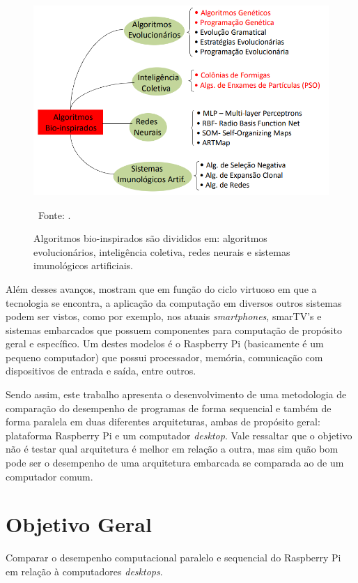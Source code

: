 \begin{figure}[htb]  
	\centering
	\includegraphics[width=.8\textwidth]{figuras/int_002}
	\caption[Algoritmos bio-inspirados]{Algoritmos bio-inspirados são divididos em: algoritmos evolucionários, inteligência coletiva, redes neurais e sistemas imunológicos artificiais.}
	\ Fonte: \cite{pappa:2015:conceitos}. 
	\label{figura:int_002}
\end{figure}

Além desses avanços, \citet{fuller:2011:computing} mostram que em função do ciclo virtuoso em que a tecnologia se encontra, a aplicação da computação em diversos outros sistemas podem ser vistos, como por exemplo, nos atuais \textit{smartphones}, smarTV's e sistemas embarcados que possuem componentes para computação de propósito geral e específico. Um destes modelos é o Raspberry Pi (basicamente é um pequeno computador) que possui processador, memória, comunicação com dispositivos de entrada e saída, entre outros.

Sendo assim, este trabalho apresenta o desenvolvimento de uma metodologia de comparação do desempenho de programas de forma sequencial e também de forma paralela em duas diferentes arquiteturas, ambas de propósito geral: plataforma Raspberry Pi e um computador \textit{desktop}. Vale ressaltar que o objetivo não é testar qual arquitetura é melhor em relação a outra, mas sim quão bom pode ser o desempenho de uma arquitetura embarcada se comparada ao de um computador comum.

\section{Objetivo Geral}
\label{subsecao:objetivo_geral}

Comparar o desempenho computacional paralelo e sequencial do Raspberry Pi em relação à computadores \textit{desktops}.

